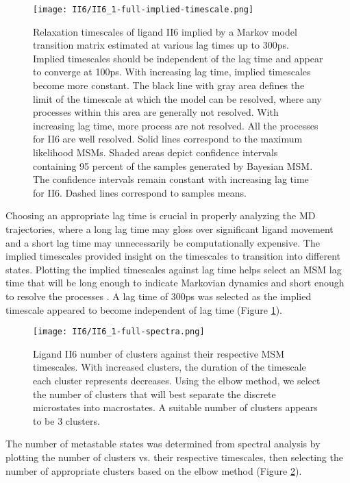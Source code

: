 \documentclass[journal=jcisd8,manuscript=article]{achemso}
\begin{document}
\begin{figure}
    \centering
    \texttt{[image: II6/II6\_1-full-implied-timescale.png]}
    \caption[SEH Implied Timescales]{Relaxation timescales of ligand II6 implied by a Markov model transition matrix estimated at various lag times up to 300ps. Implied timescales should be independent of the lag time and appear to converge at 100ps. With increasing lag time, implied timescales become more constant. The black line with gray area defines the limit of the timescale at which the model can be resolved, where any processes within this area are generally not resolved. With increasing lag time, more process are not resolved. All the processes for II6 are well resolved. Solid lines correspond to the maximum likelihood MSMs. Shaded areas depict confidence intervals containing 95 percent of the samples generated by Bayesian MSM. The confidence intervals remain constant with increasing lag time for II6. Dashed lines correspond to samples means. }
    \label{fig:II6-implied}
\end{figure}

Choosing an appropriate lag time is crucial in properly analyzing the MD trajectories, where a long lag time may gloss over significant ligand movement and a short lag time may unnecessarily be computationally expensive.
The implied timescales provided insight on the timescales to transition into different states.
Plotting the implied timescales against lag time helps select an MSM lag time that will be long enough to indicate Markovian dynamics and short enough to resolve the processes \cite{wehmeyer_introduction_2018}.
A lag time of 300ps was selected as the implied timescale appeared to become independent of lag time (Figure \ref{fig:II6-implied}). 

\begin{figure}
    \centering
    \texttt{[image: II6/II6\_1-full-spectra.png]}
    \caption{Ligand II6 number of clusters against their respective MSM timescales. With increased clusters, the duration of the timescale each cluster represents decreases. Using the elbow method, we select the number of clusters that will best separate the discrete microstates into macrostates. A suitable number of clusters appears to be 3 clusters. }
    \label{fig:II6_1-spectral}
\end{figure}

The number of metastable states was determined from spectral analysis by plotting the number of clusters vs. their respective timescales, then selecting the number of appropriate clusters based on the elbow method (Figure \ref{fig:II6_1-spectral}).
\end{document}
